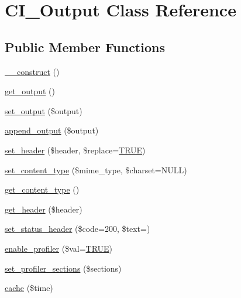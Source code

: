 \hypertarget{class_c_i___output}{}\section{C\+I\+\_\+\+Output Class Reference}
\label{class_c_i___output}
\subsection*{Public Member Functions}
\begin{DoxyCompactItemize}
\item 
\mbox{\hyperlink{class_c_i___output_a095c5d389db211932136b53f25f39685}{\+\_\+\+\_\+construct}} ()
\item 
\mbox{\hyperlink{class_c_i___output_aa6c3f8688f804de4f1af8a462fffb922}{get\+\_\+output}} ()
\item 
\mbox{\hyperlink{class_c_i___output_afcff30d791a8006216f5c2fe93a95983}{set\+\_\+output}} (\$output)
\item 
\mbox{\hyperlink{class_c_i___output_a7c79b8239d6ecbba0c8fdd00bb619651}{append\+\_\+output}} (\$output)
\item 
\mbox{\hyperlink{class_c_i___output_a270389a1636faa81eda5ef3fa900ea25}{set\+\_\+header}} (\$header, \$replace=\mbox{\hyperlink{constants_8php_ae04a3efe6aa42044f803ee90c2277846}{T\+R\+UE}})
\item 
\mbox{\hyperlink{class_c_i___output_a7e04aad8dafeec2b8626285e81231f0c}{set\+\_\+content\+\_\+type}} (\$mime\+\_\+type, \$charset=N\+U\+LL)
\item 
\mbox{\hyperlink{class_c_i___output_a4d8c59d65c47c9146dbc1c7d0c4eccf2}{get\+\_\+content\+\_\+type}} ()
\item 
\mbox{\hyperlink{class_c_i___output_afc84ca7f4f93817160ea738f2f899a74}{get\+\_\+header}} (\$header)
\item 
\mbox{\hyperlink{class_c_i___output_a6fa308cb1fadec4938edade0a51eb773}{set\+\_\+status\+\_\+header}} (\$code=200, \$text=\textquotesingle{}\textquotesingle{})
\item 
\mbox{\hyperlink{class_c_i___output_a7bd693db25952e1b074630f52ee67500}{enable\+\_\+profiler}} (\$val=\mbox{\hyperlink{constants_8php_ae04a3efe6aa42044f803ee90c2277846}{T\+R\+UE}})
\item 
\mbox{\hyperlink{class_c_i___output_ac5e50de443748cf3d356d29eba2caaaf}{set\+\_\+profiler\+\_\+sections}} (\$sections)
\item 
\mbox{\hyperlink{class_c_i___output_a6eae3cd828cf30926d44f1ab6011f939}{cache}} (\$time)
\item 

\end{DoxyCompactItemize}
